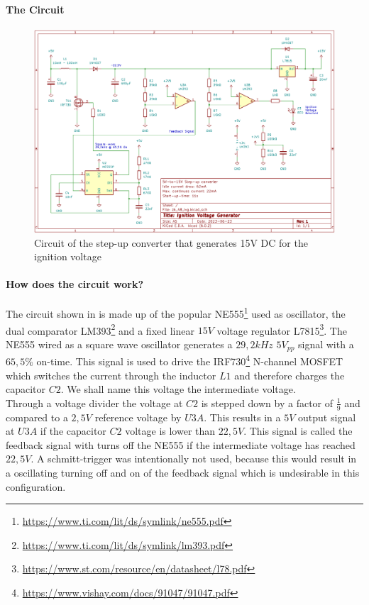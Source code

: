\paragraph{The Circuit}

\begin{figure}[!ht]
    \centering
    \includegraphics[width=15cm]{./Figures/ivg_circuit.png}
    \caption{Circuit of the step-up converter that generates 15V DC for the ignition voltage}
    \label{fig:ivg_circuit}     
\end{figure}

\pagebreak

\paragraph{How does the circuit work?}

\noindent The circuit shown in  is made up of the popular NE555\footnote{\url{ https://www.ti.com/lit/ds/symlink/ne555.pdf}} used as oscillator, the dual comparator LM393\footnote{\url{https://www.ti.com/lit/ds/symlink/lm393.pdf}} and a fixed linear $15V$ voltage regulator L7815\footnote{\url{https://www.st.com/resource/en/datasheet/l78.pdf}}. The NE555 wired as a square wave oscillator generates a $29,2kHz$ $5V_{pp}$ signal with a $65,5\% $ on-time. This signal is used to drive the IRF730\footnote{\url{https://www.vishay.com/docs/91047/91047.pdf}} N-channel MOSFET which switches the current through the inductor $L1$ and therefore charges the capacitor $C2$. We shall name this voltage the intermediate voltage.\\

\noindent Through a voltage divider the voltage at $C2$ is stepped down by a factor of $\frac{1}{9}$ and compared to a $2,5V$ reference voltage by $U3A$. This results in a $5V$ output signal at $U3A$ if the capacitor $C2$ voltage is lower than $22,5V$. This signal is called the feedback signal with turns off the NE555 if the intermediate voltage has reached $22,5V$. A schmitt-trigger was intentionally not used, because this would result in a oscillating turning off and on of the feedback signal which is undesirable in this configuration. \\

